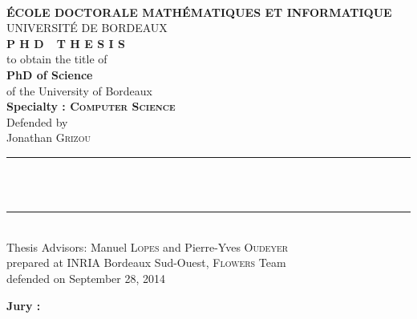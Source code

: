 
\begin{titlepage}
\begin{center}
 \\
\vspace*{0.3cm}
\noindent \textbf{\'ECOLE DOCTORALE MATH\'EMATIQUES ET INFORMATIQUE} \\
\noindent UNIVERSIT\'E DE BORDEAUX \\
\vspace*{0.5cm}
\noindent \Huge \textbf{P H D\ \ T H E S I S} \\
\vspace*{0.3cm}
\noindent \large {to obtain the title of} \\
\vspace*{0.3cm}
\noindent \LARGE \textbf{PhD of Science} \\
\vspace*{0.3cm}
\noindent \Large of the University of Bordeaux \\
\noindent \Large \textbf{Specialty : \textsc{Computer Science}}\\
\vspace*{0.4cm}
\noindent \large {Defended by\\}
\noindent \LARGE Jonathan \textsc{Grizou} \\
\vspace*{0.4cm}
\noindent\rule{10cm}{0.4pt}\\
\vspace*{0.4cm}
\noindent {\huge \textbf{\thesistitle}} \\
\vspace*{0.4cm}
\noindent\rule{10cm}{0.4pt}\\
\vspace*{0.4cm}
\noindent \Large Thesis Advisors: Manuel \textsc{Lopes} and Pierre-Yves \textsc{Oudeyer} \\
\vspace*{0.2cm}
\noindent \Large prepared at INRIA Bordeaux Sud-Ouest, \textsc{Flowers} Team\\
\vspace*{0.2cm}
\noindent \large defended on September 28, 2014 \\
\vspace*{0.5cm}
\end{center}
\noindent \large \textbf{Jury :} \\
\begin{center}
\noindent \large 
\begin{tabular}{llcclr}

\end{tabular}
\end{center}
\end{titlepage}
